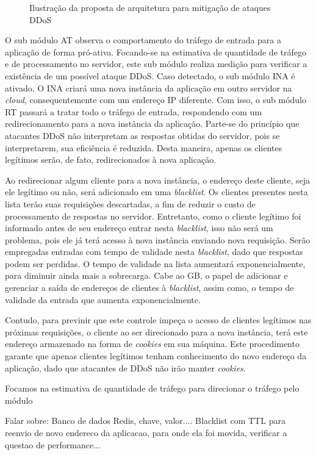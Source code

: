 \begin{figure}[b!]
\centering
\caption{Ilustração da proposta de arquitetura para mitigação de ataques DDoS}
\label{fig:arq}
\end{figure}



O sub módulo AT observa o comportamento do tráfego de entrada para a aplicação de forma pró-ativa. Focando-se na estimativa de quantidade de tráfego e de processamento no servidor, este sub módulo realiza medição para verificar a existência de um possível ataque DDoS. Caso detectado, o sub módulo INA é ativado. O INA criará uma nova instância da aplicação em outro servidor na \emph{cloud}, consequentemente com um endereço IP diferente. Com isso, o sub módulo RT passará a tratar todo o tráfego de entrada, respondendo com um redirecionamento para a nova instância da aplicação. Parte-se do princípio que atacantes DDoS não interpretam as respostas obtidas do servidor, pois se interpretarem, sua eficiência é reduzida. Desta maneira, apenas os clientes legítimos serão, de fato, redirecionados à nova aplicação.

Ao redirecionar algum cliente para a nova instância, o endereço deste cliente, seja ele legítimo ou não, será adicionado em uma \emph{blacklist}. Os clientes presentes nesta lista terão suas requisições descartadas, a fim de reduzir o custo de processamento de respostas no servidor. Entretanto, como o cliente legítimo foi informado antes de seu endereço entrar nesta \emph{blacklist}, isso não será um problema, pois ele já terá acesso à nova instância enviando nova requisição. Serão empregadas entradas com tempo de validade nesta \emph{blacklist}, dado que respostas podem ser perdidas. O tempo de validade na lista aumentará exponencialmente, para diminuir ainda mais a sobrecarga. Cabe ao GB, o papel de adicionar e gerenciar a saída de endereços de clientes à \emph{blacklist}, assim como, o tempo de validade da entrada que aumenta exponencialmente.

Contudo, para previnir que este controle impeça o acesso de clientes legítimos nas próximas requisições, o cliente ao ser direcionado para a nova instância, terá este endereço armazenado na forma de \emph{cookies} em sua máquina. Este procedimento garante que apenas clientes legítimos tenham conhecimento do novo endereço da aplicação, dado que atacantes de DDoS não irão manter \emph{cookies}.
 
Focamos na estimativa de quantidade de tráfego para direcionar o tráfego pelo módulo 


Falar sobre:
Banco de dados Redis, chave, valor....
Blacklist com TTL para reenvio de novo endereco da aplicacao, para onde ela foi movida, verificar a questao de performance...
